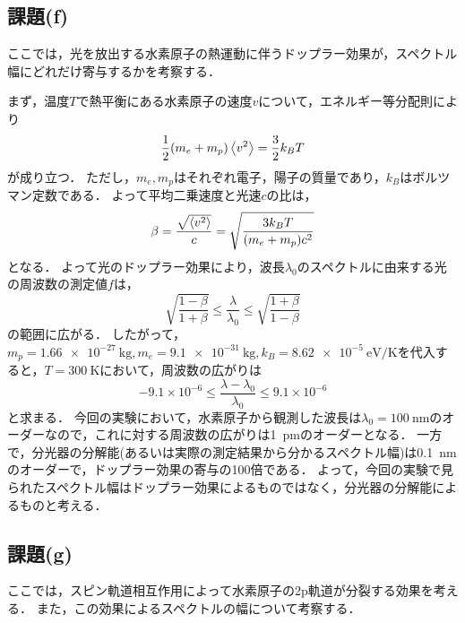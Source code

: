 \documentclass[titlepage]{jsarticle}
\begin{document}
\subsection{課題(f)}
ここでは，光を放出する水素原子の熱運動に伴うドップラー効果が，スペクトル幅にどれだけ寄与するかを考察する．

まず，温度$T$で熱平衡にある水素原子の速度$v$について，エネルギー等分配則により
\begin{equation}
  \frac{1}{2} \qty(m_e + m_p) \expval{v^2} = \frac{3}{2} k_B T
\end{equation}
が成り立つ．
ただし，$m_e,m_p$はそれぞれ電子，陽子の質量であり，$k_B$はボルツマン定数である．
よって平均二乗速度と光速$c$の比は，
\begin{equation}
  \beta = \frac{\sqrt{\expval{v^2}}}{c} = \sqrt{\frac{3k_B T}{(m_e + m_p)c^2}}
\end{equation}
となる．
よって光のドップラー効果により，波長$\lambda_0$のスペクトルに由来する光の周波数の測定値$f$は，
\begin{equation}
  \sqrt{\frac{1-\beta}{1+\beta}} \le \frac{\lambda}{\lambda_0} \le \sqrt{\frac{1+\beta}{1-\beta}}
\end{equation}
の範囲に広がる．
したがって，$m_p=\SI{1.66e-27}{\kg},m_e=\SI{9.1e-31}{\kg},k_B=\SI{8.62e-5}{\eV\per\kelvin}$を代入すると，$T=\SI{300}{\kelvin}$において，周波数の広がりは
\begin{equation}
  -9.1\times 10^{-6} \le \frac{\lambda-\lambda_0}{\lambda_0} \le 9.1\times 10^{-6}
\end{equation}
と求まる．
今回の実験において，水素原子から観測した波長は$\lambda_0 = \SI{100}{\nm}$のオーダーなので，これに対する周波数の広がりは\SI{1}{\pm}のオーダーとなる．
一方で，分光器の分解能(あるいは実際の測定結果から分かるスペクトル幅)は\SI{0.1}{\nm}のオーダーで，ドップラー効果の寄与の100倍である．
よって，今回の実験で見られたスペクトル幅はドップラー効果によるものではなく，分光器の分解能によるものと考える．

\subsection{課題(g)}
ここでは，スピン軌道相互作用によって水素原子の2p軌道が分裂する効果を考える．
また，この効果によるスペクトルの幅について考察する．
\end{document}

